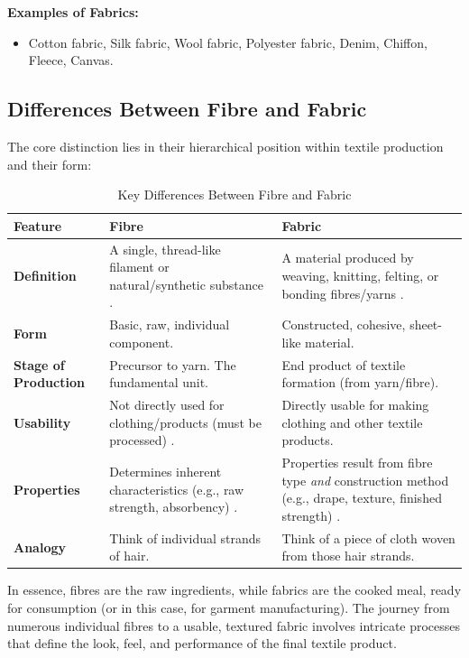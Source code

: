 \textbf{Examples of Fabrics:}
\begin{itemize}
    \item Cotton fabric, Silk fabric, Wool fabric, Polyester fabric, Denim, Chiffon, Fleece, Canvas.
\end{itemize}

\newpage

\subsection{Differences Between Fibre and Fabric}

The core distinction lies in their hierarchical position within textile production and their form:

\begin{table}[h!]
    \centering
    \caption{Key Differences Between Fibre and Fabric}
    \label{tab:fibre_fabric_diff}
    \begin{tabular}{l p{5cm} p{5cm}} %
        \toprule
        \textbf{Feature} & \textbf{Fibre} & \textbf{Fabric} \\
        \midrule
        \textbf{Definition} & A single, thread-like filament or natural/synthetic substance \cite{researchgate}. & A material produced by weaving, knitting, felting, or bonding fibres/yarns \cite{researchgate, hong2024research}. \\
        \textbf{Form} & Basic, raw, individual component. & Constructed, cohesive, sheet-like material. \\
        \textbf{Stage of Production} & Precursor to yarn. The fundamental unit. & End product of textile formation (from yarn/fibre). \\
        \textbf{Usability} & Not directly used for clothing/products (must be processed) \cite{researchgate}. & Directly usable for making clothing and other textile products. \\
        \textbf{Properties} & Determines inherent characteristics (e.g., raw strength, absorbency) \cite{researchgate}. & Properties result from fibre type \textit{and} construction method (e.g., drape, texture, finished strength) \cite{researchgate, hong2024research}. \\
        \textbf{Analogy} & Think of individual strands of hair. & Think of a piece of cloth woven from those hair strands. \\
        \bottomrule
    \end{tabular}
\end{table}

In essence, fibres are the raw ingredients, while fabrics are the cooked meal, ready for consumption (or in this case, for garment manufacturing). The journey from numerous individual fibres to a usable, textured fabric involves intricate processes that define the look, feel, and performance of the final textile product.